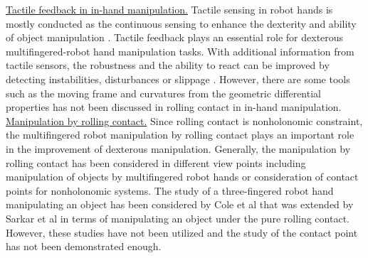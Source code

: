 

\noindent\uline{Tactile feedback in in-hand manipulation.} Tactile sensing in robot hands is mostly conducted as the continuous sensing to enhance the dexterity and ability of object manipulation \cite{Howard89_SurveyofRobot_TactileSensing}.
Tactile feedback plays an essential role for dexterous multifingered-robot hand manipulation tasks. With additional information from tactile sensors, the robustness and the ability to react can be improved by detecting instabilities, disturbances or slippage \cite{Bekiroglu_GraspStability_Tactile, MiaoLi_GraspAdaption_Tactile}. However, there are some tools such as the moving frame and curvatures from the geometric differential properties has not been discussed in rolling contact in in-hand manipulation.\\

\noindent\uline{Manipulation by rolling contact.} Since rolling contact is nonholonomic constraint, the multifingered robot manipulation by rolling contact plays an important role in the improvement of dexterous manipulation. Generally, the manipulation by rolling contact has been considered in different view points including manipulation of objects by multifingered robot hands or consideration of contact points for nonholonomic systems. The study of a three-fingered robot hand manipulating an object has been considered by Cole et al \cite{Cole89_Kinematics_multifingered-RC} that was extended by Sarkar et al \cite{Sarkar97_DynamicControl_3D_RC} in terms of manipulating an object under the pure rolling contact. However, these studies have not been utilized and the study of the contact point has not been demonstrated enough.\\



